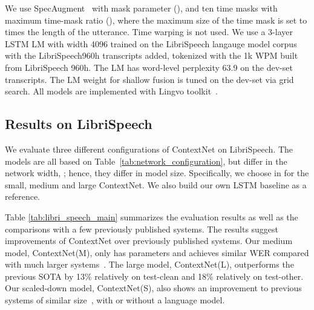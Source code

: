 \documentclass[a4paper]{article}
\newcommand{\netname}{ContextNet}
\begin{document}
We use SpecAugment~\cite{park2019specaugment, largespecaugment} with mask parameter (), and ten time masks with maximum time-mask ratio (), where the maximum size of the time mask is set to  times the length of the utterance. Time warping is not used. We use a 3-layer LSTM LM with width 4096 trained on the LibriSpeech langauge model corpus with the LibriSpeech960h transcripts added, tokenized with the 1k WPM built from LibriSpeech 960h. The LM has word-level perplexity 63.9 on the dev-set transcripts. The LM weight  for shallow fusion is tuned on the dev-set via grid search. All models are implemented with Lingvo toolkit~\cite{lingvo}.

\vspace{-0.05in}
\subsection{Results on LibriSpeech}
\vspace{-0.02in}

We evaluate three different configurations of \netname{} on LibriSpeech. The models are all based  on Table~\ref{tab:network_configuration}, but differ in the network width, ; hence, they differ in model size. Specifically, we choose  in  for the small, medium and large \netname{}. We also build our own LSTM baseline as a reference.

Table \ref{tab:libri_speech_main} summarizes the evaluation results as well as the comparisons with a few previously published systems. The results suggest improvements of \netname{} over previously published systems. Our medium model, \netname(M), only has  parameters and achieves similar WER compared with much larger systems~\cite{zhang2020transformer,synnaeve2019endtoend}. The large model, \netname(L), outperforms the previous SOTA by 13\% relatively on test-clean and 18\% relatively on test-other. Our scaled-down model, \netname(S), also shows an improvement to previous systems of similar size~\cite{kriman2019quartznet}, with or without a language model. 
\end{document}
